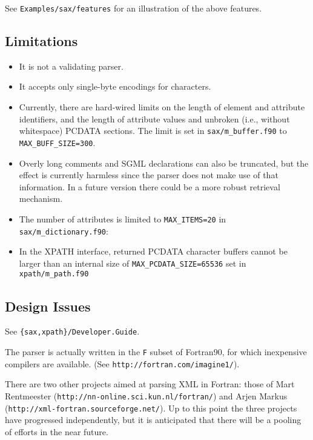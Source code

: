 \documentclass[11pt]{article}
\begin{document}
See \texttt{Examples/sax/features} for an illustration of the above
features.

\subsection{Limitations}
\begin{itemize}

\item It is not a validating parser.

\item It accepts only single-byte encodings for characters. 

\item Currently, there are hard-wired limits on the length of element
  and attribute identifiers, and the length of attribute values and
  unbroken (i.e., without whitespace) PCDATA sections.  The limit is
  set in \texttt{sax/m\_buffer.f90} to \texttt{MAX\_BUFF\_SIZE=300}.

\item Overly long comments and SGML declarations can also be
truncated, but the effect is currently harmless since the parser does
not make use of that information. In a future version there could be a
more robust retrieval mechanism.

\item  The number of attributes is limited to \texttt{MAX\_ITEMS=20}
  in \texttt{sax/m\_dictionary.f90}: 

 
 \item In the XPATH interface, returned PCDATA character buffers
 cannot be larger than an internal size of
 \texttt{MAX\_PCDATA\_SIZE=65536} set in \texttt{xpath/m\_path.f90}


\end{itemize}

\subsection{Design Issues}

See \texttt{\{sax,xpath\}/Developer.Guide}.

The parser is actually written in the \texttt{F} subset of Fortran90,
for which inexpensive compilers are available. (See
\texttt{http://fortran.com/imagine1/}).
 
There are two other projects aimed at parsing XML in Fortran: those of
Mart Rentmeester (\texttt{http://nn-online.sci.kun.nl/fortran/}) and
Arjen Markus (\texttt{http://xml-fortran.sourceforge.net/}). Up to
this point the three projects have progressed independently, but it is
anticipated that there will be a pooling of efforts in the near
future. 
\end{document}
